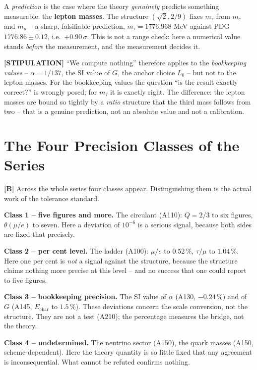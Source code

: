 A \emph{prediction} is the case where the theory \emph{genuinely} predicts
something measurable: the \textbf{lepton masses}. The structure $(\sqrt2, 2/9)$
fixes $m_\tau$ from $m_e$ and $m_\mu$ -- a sharp, falsifiable prediction,
$m_\tau = 1776{.}968$ MeV against PDG $1776{.}86\pm0{.}12$, i.e.\ $+0{.}90\,\sigma$.
This is not a range check: here a numerical value stands \emph{before} the
measurement, and the measurement decides it.

\textbf{[STIPULATION]} ``We compute nothing'' therefore applies to the
\emph{bookkeeping values} -- $\alpha = 1/137$, the SI value of $G$, the anchor
choice $L_0$ -- but not to the lepton masses. For the bookkeeping values the
question ``is the result exactly correct?'' is wrongly posed; for $m_\tau$ it
is exactly right. The difference: the lepton masses are bound so tightly by a
\emph{ratio} structure that the third mass follows from two -- that is a genuine
prediction, not an absolute value and not a calibration.

\section{The Four Precision Classes of the Series}

\textbf{[B]} Across the whole series four classes appear. Distinguishing them is
the actual work of the tolerance standard.

\textbf{Class 1 -- five figures and more.} The circulant (A110): $Q=2/3$ to six
figures, $\theta(\mu/e)$ to seven. Here a deviation of $10^{-6}$ is a serious
signal, because both sides are fixed that precisely.

\textbf{Class 2 -- per cent level.} The ladder (A100): $\mu/e$ to $0{.}52\,\%$,
$\tau/\mu$ to $1{.}04\,\%$. Here one per cent is \emph{not} a signal against the
structure, because the structure claims nothing more precise at this level -- and
no success that one could report to five figures.

\textbf{Class 3 -- bookkeeping precision.} The SI value of $\alpha$ (A130,
$-0{.}24\,\%$) and of $G$ (A145, $E_\text{char}$ to $1{.}5\,\%$). These
deviations concern the scale conversion, not the structure. They are not a test
(A210); the percentage measures the bridge, not the theory.

\textbf{Class 4 -- undetermined.} The neutrino sector (A150), the quark masses
(A150, scheme-dependent). Here the theory quantity is so little fixed that any
agreement is inconsequential. What cannot be refuted confirms nothing.


